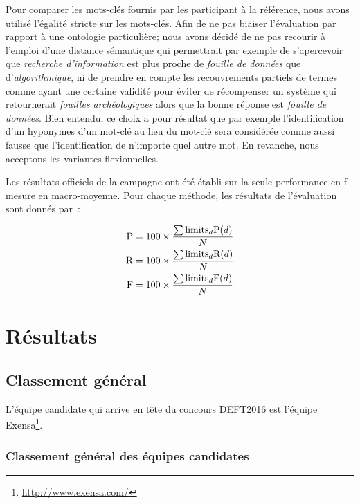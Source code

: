 \documentclass[10pt,twoside]{article}
\begin{document}
Pour comparer les mots-clés fournis par les participant à la référence, nous avons  utilisé l'égalité stricte sur les mots-clés.  Afin de ne pas biaiser l'évaluation par rapport à une ontologie
particulière; nous avons décidé de ne pas recourir à l'emploi d'une distance sémantique qui permettrait par exemple de s’apercevoir que
\textit{recherche d'information} est plus proche de \textit{fouille de données} que
d'\textit{algorithmique}, ni de  prendre en compte les recouvrements
partiels de termes comme ayant une certaine validité pour éviter de récompenser
un système qui retournerait \textit{fouilles archéologiques} alors que la bonne réponse
est \textit{fouille de données}. Bien entendu, ce choix a pour résultat que par exemple
l'identification d'un hyponymes d'un mot-clé au lieu du mot-clé sera considérée
comme aussi fausse que l'identification de n'importe quel autre mot. En
revanche, nous acceptons les variantes flexionnelles.

Les résultats officiels de la campagne ont été établi sur la seule performance en f-mesure en macro-moyenne. Pour chaque méthode, les résultats de l'évaluation sont donnés par~:
\begin{center}  
\begin{align}
      \textnormal{P} &= 100 \times \frac{\sum \textnormal{limits}_d \textnormal{P}(d)}{N} \label{}\\
      \textnormal{R} &= 100 \times \frac{\sum \textnormal{limits}_d \textnormal{R}(d)}{N} \label{}\\
      \textnormal{F} &= 100 \times \frac{\sum \textnormal{limits}_d \textnormal{F}(d)}{N} \label{}\\
    \end{align}
     \end{center}  

\section{Résultats}
    
\subsection{Classement général}
\label{sec:classement-general}

L'équipe candidate qui arrive en tête du concours DEFT2016 est l'équipe Exensa\footnote{\url{http://www.exensa.com/}}.

\subsubsection{Classement général des équipes candidates}
\end{document}
